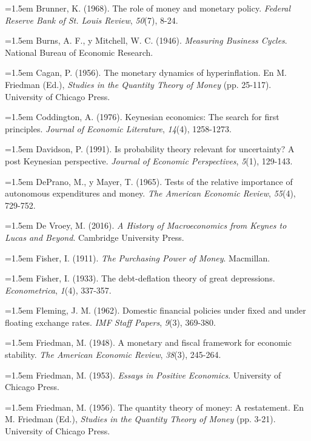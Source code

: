\documentclass[10pt,a4paper]{article}
\begin{document}
\noindent\hangindent=1.5em Brunner, K. (1968). The role of money and monetary policy. \textit{Federal Reserve Bank of St. Louis Review}, \textit{50}(7), 8-24.

\noindent\hangindent=1.5em Burns, A. F., y Mitchell, W. C. (1946). \textit{Measuring Business Cycles}. National Bureau of Economic Research.

\noindent\hangindent=1.5em Cagan, P. (1956). The monetary dynamics of hyperinflation. En M. Friedman (Ed.), \textit{Studies in the Quantity Theory of Money} (pp. 25-117). University of Chicago Press.

\noindent\hangindent=1.5em Coddington, A. (1976). Keynesian economics: The search for first principles. \textit{Journal of Economic Literature}, \textit{14}(4), 1258-1273.

\noindent\hangindent=1.5em Davidson, P. (1991). Is probability theory relevant for uncertainty? A post Keynesian perspective. \textit{Journal of Economic Perspectives}, \textit{5}(1), 129-143.

\noindent\hangindent=1.5em DePrano, M., y Mayer, T. (1965). Tests of the relative importance of autonomous expenditures and money. \textit{The American Economic Review}, \textit{55}(4), 729-752.

\noindent\hangindent=1.5em De Vroey, M. (2016). \textit{A History of Macroeconomics from Keynes to Lucas and Beyond}. Cambridge University Press.

\noindent\hangindent=1.5em Fisher, I. (1911). \textit{The Purchasing Power of Money}. Macmillan.

\noindent\hangindent=1.5em Fisher, I. (1933). The debt-deflation theory of great depressions. \textit{Econometrica}, \textit{1}(4), 337-357.

\noindent\hangindent=1.5em Fleming, J. M. (1962). Domestic financial policies under fixed and under floating exchange rates. \textit{IMF Staff Papers}, \textit{9}(3), 369-380.

\noindent\hangindent=1.5em Friedman, M. (1948). A monetary and fiscal framework for economic stability. \textit{The American Economic Review}, \textit{38}(3), 245-264.

\noindent\hangindent=1.5em Friedman, M. (1953). \textit{Essays in Positive Economics}. University of Chicago Press.

\noindent\hangindent=1.5em Friedman, M. (1956). The quantity theory of money: A restatement. En M. Friedman (Ed.), \textit{Studies in the Quantity Theory of Money} (pp. 3-21). University of Chicago Press.
\end{document}
